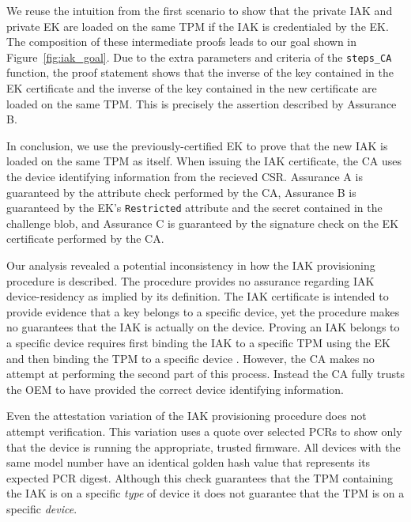 \documentclass[runningheads]{llncs}
\begin{document}
We reuse the intuition from the first scenario to show that the private
IAK and private EK are loaded on the same TPM if the IAK is
credentialed by the EK.
The composition of these intermediate proofs leads
to our goal shown in Figure~\ref{fig:iak_goal}.  Due to the extra
parameters and criteria of the \verb|steps_CA| function, the proof
statement shows that the inverse of the key contained in the EK
certificate and the inverse of the key contained in the new
certificate are loaded on the same TPM. This is precisely the
assertion described by Assurance B.

In conclusion, we use the previously-certified EK to prove that the new
IAK is loaded on the same TPM as itself. When issuing the IAK
certificate, the CA uses the device identifying information from the
recieved CSR.  Assurance A is guaranteed by the attribute check
performed by the CA, Assurance B is guaranteed by the EK's
\verb|Restricted| attribute and the secret contained in the challenge
blob, and Assurance C is guaranteed by the signature check on the EK
certificate performed by the CA.

Our analysis revealed a potential inconsistency in how the IAK
provisioning procedure is described. The procedure provides no
assurance regarding IAK device-residency as implied by its definition.
The IAK certificate is intended to provide evidence that a key belongs
to a specific device, yet the procedure makes no guarantees that the
IAK is actually on the device.  Proving an IAK belongs to a specific
device requires first binding the IAK to a specific TPM using the EK
and then binding the TPM to a specific device \citep{DevIDSpec-TCG}.
However, the CA makes no attempt at performing the second part of this
process. Instead the CA fully trusts the OEM to have provided the
correct device identifying information.

Even the attestation variation of the IAK provisioning procedure does
not attempt verification. This variation uses a quote over selected
PCRs to show only that the device is running the appropriate, trusted
firmware. All devices with the same model number have an identical
golden hash value that represents its expected PCR digest.  Although
this check guarantees that the TPM containing the IAK is on a specific
\textit{type} of device it does not guarantee that the TPM is on a
specific \emph{device}.
\end{document}
